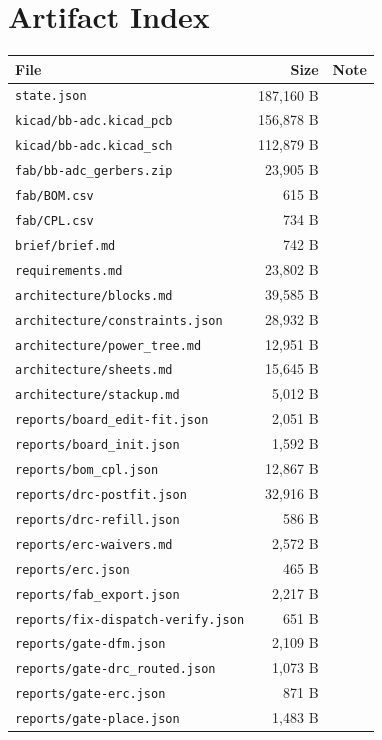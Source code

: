 \documentclass[11pt,a4paper]{article}
\begin{document}
\section{Artifact Index}
{\small
\begin{longtable}{p{9cm}rp{4cm}}
\toprule
\textbf{File} & \textbf{Size} & \textbf{Note} \\
\midrule
\endhead
\texttt{state.json} & 187,160 B &  \\
\texttt{kicad/bb-adc.kicad\_pcb} & 156,878 B &  \\
\texttt{kicad/bb-adc.kicad\_sch} & 112,879 B &  \\
\texttt{fab/bb-adc\_gerbers.zip} & 23,905 B &  \\
\texttt{fab/BOM.csv} & 615 B &  \\
\texttt{fab/CPL.csv} & 734 B &  \\
\texttt{brief/brief.md} & 742 B &  \\
\texttt{requirements.md} & 23,802 B &  \\
\texttt{architecture/blocks.md} & 39,585 B &  \\
\texttt{architecture/constraints.json} & 28,932 B &  \\
\texttt{architecture/power\_tree.md} & 12,951 B &  \\
\texttt{architecture/sheets.md} & 15,645 B &  \\
\texttt{architecture/stackup.md} & 5,012 B &  \\
\texttt{reports/board\_edit-fit.json} & 2,051 B &  \\
\texttt{reports/board\_init.json} & 1,592 B &  \\
\texttt{reports/bom\_cpl.json} & 12,867 B &  \\
\texttt{reports/drc-postfit.json} & 32,916 B &  \\
\texttt{reports/drc-refill.json} & 586 B &  \\
\texttt{reports/erc-waivers.md} & 2,572 B &  \\
\texttt{reports/erc.json} & 465 B &  \\
\texttt{reports/fab\_export.json} & 2,217 B &  \\
\texttt{reports/fix-dispatch-verify.json} & 651 B &  \\
\texttt{reports/gate-dfm.json} & 2,109 B &  \\
\texttt{reports/gate-drc\_routed.json} & 1,073 B &  \\
\texttt{reports/gate-erc.json} & 871 B &  \\
\texttt{reports/gate-place.json} & 1,483 B &  \\

\end{longtable}}
\end{document}
